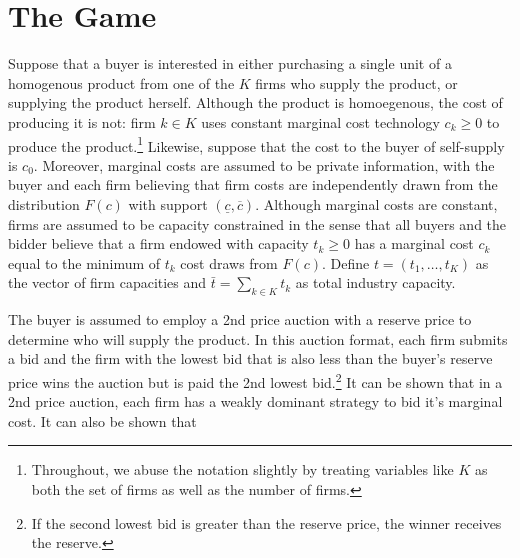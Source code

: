 \documentclass[11pt,numbers=noenddot,pointlessnumbers]{scrreprt}
\numberwithin{equation}{section}
\begin{document}
\section{The Game}
Suppose that a buyer is interested in either purchasing a single unit of a
homogenous product from one of the $K$ firms who supply the product,
or supplying the product herself. Although the product is homoegenous,
the cost of producing it is not: firm $k\in K$ uses constant marginal
cost technology $c_k\ge 0$ to produce the product.\footnote{Throughout, we abuse the notation slightly by
  treating variables like $K$ as both the set of firms as well as the
  number of firms.} Likewise, suppose that the cost to the buyer of
self-supply is $c_0$. Moreover, marginal costs are assumed to be private
information,  with the buyer and each firm believing that firm costs
are independently drawn from  the distribution $F(c)$ with support
$(\underline{c},\overline{c})$. Although marginal costs are
constant, firms are assumed to be capacity constrained in the sense
that all buyers and the bidder believe that a firm endowed with capacity
$t_k\ge 0$ has a marginal  cost $c_k$ equal to the minimum of  $t_k$ cost
draws from $F(c)$. Define $t=(t_1,\ldots,t_K)$ as the vector of firm
capacities and $\bar{t}=\sum\limits_{k\in K}t_k$ as total industry capacity.

The buyer is assumed to employ a 2nd price auction with a reserve
price to determine who will supply the product. In this auction
format, each firm submits a bid and the firm with the lowest bid that
is also less than the buyer's reserve price wins the auction
but is paid the 2nd lowest bid.\footnote{If the second lowest bid is
  greater than the reserve price, the winner receives the reserve.} It can be shown that in a 2nd price
auction, each firm has a weakly dominant strategy to bid it's
marginal cost. It can also be shown that
\end{document}
